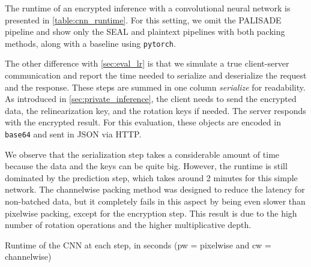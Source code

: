 \documentclass[a4paper,11pt,oneside]{report}
\begin{document}
The runtime of an encrypted inference with a convolutional neural network is presented in \autoref{table:cnn_runtime}. 
For this setting, we omit the PALISADE pipeline and show only the SEAL and plaintext pipelines with both packing methods, along with a baseline using \texttt{pytorch}.

The other difference with \autoref{sec:eval_lr} is that we simulate a true client-server communication and report the time needed to serialize and deserialize the request and the response.
These steps are summed in one column \emph{serialize} for readability.
As introduced in \autoref{sec:private_inference}, the client needs to send the encrypted data, the relinearization key, and the rotation keys if needed.
The server responds with the encrypted result.
For this evaluation, these objects are encoded in \texttt{base64} and sent in JSON via HTTP.

We observe that the serialization step takes a considerable amount of time because the data and the keys can be quite big. 
However, the runtime is still dominated by the prediction step, which takes around 2 minutes for this simple network.
The channelwise packing method was designed to reduce the latency for non-batched data, but it completely fails in this aspect by being even slower than pixelwise packing, except for the encryption step.
This result is due to the high number of rotation operations and the higher multiplicative depth.

\begin{table}[h!]
  \begin{center}
    \caption{Runtime of the CNN at each step, in seconds (pw = pixelwise and cw = channelwise)}
    \label{table:cnn_runtime}
  \end{center}
\end{table}
\end{document}
